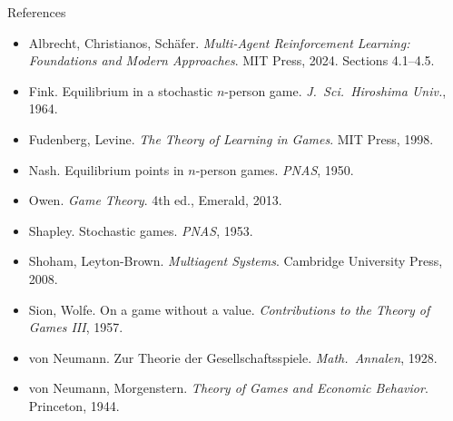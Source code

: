 \documentclass[aspectratio=169,11pt]{beamer}
\begin{document}
\begin{frame}{References}
  \footnotesize
  \begin{itemize}
    \item Albrecht, Christianos, Sch\"afer. \emph{Multi-Agent Reinforcement Learning: Foundations and Modern Approaches}. MIT Press, 2024. Sections 4.1--4.5.
    \item Fink. Equilibrium in a stochastic $n$-person game. \emph{J.\ Sci.\ Hiroshima Univ.}, 1964.
    \item Fudenberg, Levine. \emph{The Theory of Learning in Games}. MIT Press, 1998.
    \item Nash. Equilibrium points in $n$-person games. \emph{PNAS}, 1950.
    \item Owen. \emph{Game Theory}. 4th ed., Emerald, 2013.
    \item Shapley. Stochastic games. \emph{PNAS}, 1953.
    \item Shoham, Leyton-Brown. \emph{Multiagent Systems}. Cambridge University Press, 2008.
    \item Sion, Wolfe. On a game without a value. \emph{Contributions to the Theory of Games III}, 1957.
    \item von Neumann. Zur Theorie der Gesellschaftsspiele. \emph{Math.\ Annalen}, 1928.
    \item von Neumann, Morgenstern. \emph{Theory of Games and Economic Behavior}. Princeton, 1944.
  \end{itemize}
\end{frame}
\end{document}
